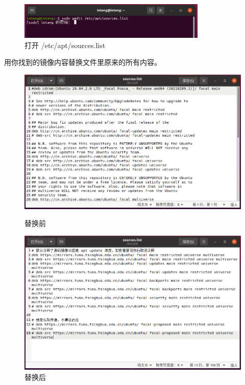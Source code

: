 \documentclass[UTF-8]{ctexart}
\begin{document}
				\begin{figure}[H]
					\centering
					\includegraphics[width=0.8\textwidth]{fig/gedit_etcaptsourceslist.png}
					\caption*{打开 /etc/apt/sources.list}
				\end{figure}
				
				用你找到的镜像内容替换文件里原来的所有内容。
				
				\begin{figure}[H]
					\centering
					\begin{minipage}{0.41\textwidth}
						\centering
						\includegraphics[width=\textwidth]{fig/sourceslist_before.png}
						\caption*{替换前}
					\end{minipage}
					\begin{minipage}{0.41\textwidth}
						\centering
						\includegraphics[width=\textwidth]{fig/sourceslist_after.png}
						\caption*{替换后}
					\end{minipage}
				\end{figure}
			
\end{document}
